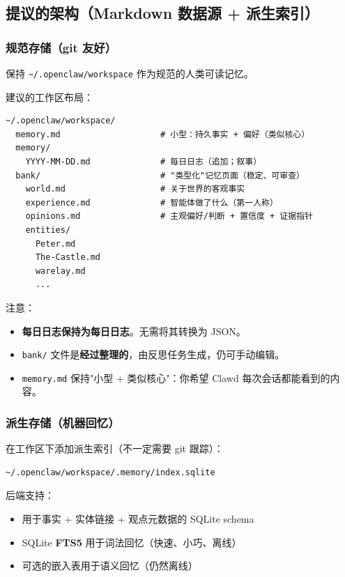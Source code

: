 \subsection{提议的架构（Markdown 数据源 + 派生索引）}


\subsubsection{规范存储（git 友好）}


保持 \texttt{\textasciitilde{}/.openclaw/workspace} 作为规范的人类可读记忆。

建议的工作区布局：

\begin{lstlisting}
~/.openclaw/workspace/
  memory.md                    # 小型：持久事实 + 偏好（类似核心）
  memory/
    YYYY-MM-DD.md              # 每日日志（追加；叙事）
  bank/                        # "类型化"记忆页面（稳定、可审查）
    world.md                   # 关于世界的客观事实
    experience.md              # 智能体做了什么（第一人称）
    opinions.md                # 主观偏好/判断 + 置信度 + 证据指针
    entities/
      Peter.md
      The-Castle.md
      warelay.md
      ...
\end{lstlisting}


注意：

\begin{itemize}
  \item \textbf{每日日志保持为每日日志}。无需将其转换为 JSON。
  \item \texttt{bank/} 文件是\textbf{经过整理的}，由反思任务生成，仍可手动编辑。
  \item \texttt{memory.md} 保持"小型 + 类似核心"：你希望 Clawd 每次会话都能看到的内容。
\end{itemize}


\subsubsection{派生存储（机器回忆）}


在工作区下添加派生索引（不一定需要 git 跟踪）：

\begin{lstlisting}
~/.openclaw/workspace/.memory/index.sqlite
\end{lstlisting}


后端支持：

\begin{itemize}
  \item 用于事实 + 实体链接 + 观点元数据的 SQLite schema
  \item SQLite \textbf{FTS5} 用于词法回忆（快速、小巧、离线）
  \item 可选的嵌入表用于语义回忆（仍然离线）
\end{itemize}



